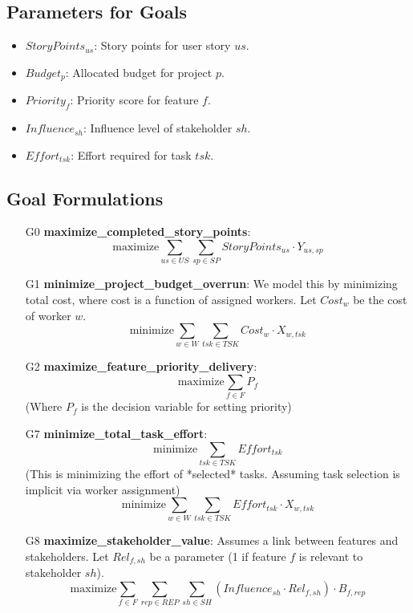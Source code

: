 \documentclass[11pt]{article}
\begin{document}
\subsection*{Parameters for Goals}
\begin{itemize}
    \item $StoryPoints_{us}$: Story points for user story $us$.
    \item $Budget_p$: Allocated budget for project $p$.
    \item $Priority_f$: Priority score for feature $f$.
    \item $Influence_{sh}$: Influence level of stakeholder $sh$.
    \item $Effort_{tsk}$: Effort required for task $tsk$.
\end{itemize}

\subsection*{Goal Formulations}
\begin{itemize}
    \item [G0] \textbf{maximize\_completed\_story\_points}:
    $$ \text{maximize} \sum_{us \in US} \sum_{sp \in SP} StoryPoints_{us} \cdot Y_{us, sp} $$

    \item [G1] \textbf{minimize\_project\_budget\_overrun}: We model this by minimizing total cost, where cost is a function of assigned workers. Let $Cost_w$ be the cost of worker $w$.
    $$ \text{minimize} \sum_{w \in W} \sum_{tsk \in TSK} Cost_w \cdot X_{w, tsk} $$
    
    \item [G2] \textbf{maximize\_feature\_priority\_delivery}:
    $$ \text{maximize} \sum_{f \in F} P_f $$
    (Where $P_f$ is the decision variable for setting priority)

    \item [G7] \textbf{minimize\_total\_task\_effort}:
    $$ \text{minimize} \sum_{tsk \in TSK} Effort_{tsk} $$
    (This is minimizing the effort of *selected* tasks. Assuming task selection is implicit via worker assignment)
    $$ \text{minimize} \sum_{w \in W} \sum_{tsk \in TSK} Effort_{tsk} \cdot X_{w, tsk} $$

    \item [G8] \textbf{maximize\_stakeholder\_value}: Assumes a link between features and stakeholders. Let $Rel_{f,sh}$ be a parameter (1 if feature $f$ is relevant to stakeholder $sh$).
    $$ \text{maximize} \sum_{f \in F} \sum_{rep \in REP} \sum_{sh \in SH} (Influence_{sh} \cdot Rel_{f,sh}) \cdot B_{f, rep} $$
\end{itemize}
\end{document}
